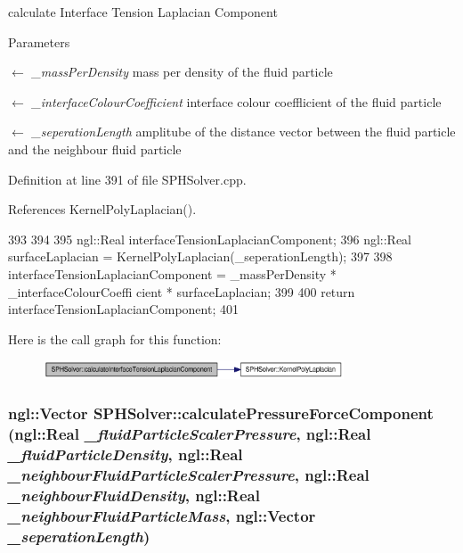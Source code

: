 calculate Interface Tension Laplacian Component 


\begin{DoxyParams}{Parameters}
\item[\mbox{$\leftarrow$} {\em \_\-massPerDensity}]mass per density of the fluid particle \item[\mbox{$\leftarrow$} {\em \_\-interfaceColourCoefficient}]interface colour coefflicient of the fluid particle \item[\mbox{$\leftarrow$} {\em \_\-seperationLength}]amplitube of the distance vector between the fluid particle and the neighbour fluid particle \end{DoxyParams}


Definition at line 391 of file SPHSolver.cpp.



References KernelPolyLaplacian().




\begin{DoxyCode}
393 {
394 
395     ngl::Real interfaceTensionLaplacianComponent;
396     ngl::Real surfaceLaplacian = KernelPolyLaplacian(_seperationLength);
397 
398     interfaceTensionLaplacianComponent = _massPerDensity * _interfaceColourCoeffi
      cient * surfaceLaplacian;
399 
400     return interfaceTensionLaplacianComponent;
401 }
\end{DoxyCode}




Here is the call graph for this function:\nopagebreak
\begin{figure}[H]
\begin{center}
\leavevmode
\includegraphics[width=253pt]{class_s_p_h_solver_ac1f193569656db4fe11aa5f716c5169b_cgraph}
\end{center}
\end{figure}


\hypertarget{class_s_p_h_solver_ad137f4330190d8627fdb93ba373bb406}{
\subsubsection[{calculatePressureForceComponent}]{\setlength{\rightskip}{0pt plus 5cm}ngl::Vector SPHSolver::calculatePressureForceComponent (ngl::Real {\em \_\-fluidParticleScalerPressure}, \/  ngl::Real {\em \_\-fluidParticleDensity}, \/  ngl::Real {\em \_\-neighbourFluidParticleScalerPressure}, \/  ngl::Real {\em \_\-neighbourFluidDensity}, \/  ngl::Real {\em \_\-neighbourFluidParticleMass}, \/  ngl::Vector {\em \_\-seperationLength})}}
\label{class_s_p_h_solver_ad137f4330190d8627fdb93ba373bb406}


